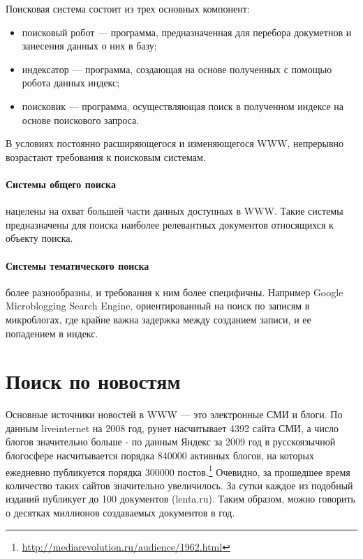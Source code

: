 Поисковая система состоит из трех основных компонент: 
\begin{itemize}
 \item поисковый робот --- программа, предназначенная для перебора докуметнов и
занесения данных о них в базу;
 \item индексатор --- программа, создающая на основе полученных с помощью робота данных индекс;
 \item поисковик --- программа, осуществляющая поиск в полученном индексе на основе поискового запроса.
\end{itemize} В условиях постоянно расширяющегося и изменяющегося WWW, непрерывно
возрастают требования к поисковым системам. 

\paragraph{Системы общего поиска} нацелены на охват большей части данных
доступных в WWW. Такие системы предназначены для поиска наиболее релевантных
документов относящихся к объекту поиска. 
\paragraph{Системы тематического поиска} более разнообразны, и требования к ним более специфичны.
 Например Google Microblogging Search Engine, ориентированный на поиск по записям в микроблогах,
где крайне важна задержка между созданием записи, и ее попадением в индекс.

\section{Поиск по новостям}

Основные источники новостей в WWW --- это электронные СМИ и блоги. По данным
liveinternet на 2008 год, рунет насчитывает 4392 сайта СМИ,
 а число блогов значительно больше - по данным Яндекс за 2009 год в русскоязычной блогосфере насчитывается порядка 840000 активных блогов, 
на которых ежедневно публикуется порядка 300000 постов.\footnote{\href{http://mediarevolution.ru/audience/1962.html}{http://mediarevolution.ru/audience/1962.html}}
Очевидно, за прошедшее время количество таких сайтов значительно увеличилось. За сутки каждое
из подобный изданий публикует до 100 документов (lenta.ru). Таким образом, 
можно говорить о десятках миллионов создаваемых документов в год.

